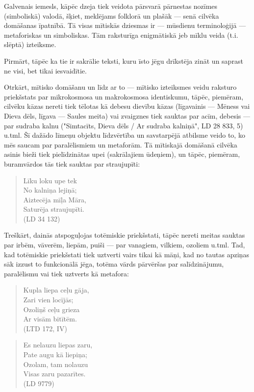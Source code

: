 \documentclass[11pt]{article}
\begin{document}
Galvenais iemesls, kāpēc dzeja tiek veidota pārsvarā
pārnestas nozīmes (simboliskā) valodā, šķiet, meklējams
folklorā un plašāk --- senā cilvēka domāšanas
īpatnībā. Tā visas mītiskās dziesmas ir --- mūsdienu
terminoloģijā --- metaforiskas un simboliskas.
Tām raksturīga enigmātiskā jeb mīklu veida
(t.i. slēptā) izteiksme.

Pirmārt, tāpēc ka tie ir sakrālie teksti, kuru īsto jēgu
drīkstēja zināt un saprast ne visi, bet tikai iesvaidītie.

Otrkārt, mītisko domāšanu un līdz ar to --- mītisko
izteiksmes veidu raksturo priekšstats par mikrokosmosa
un makrokosmosa identiskumu, tāpēc, piemēram,
cilvēku kāzas nereti tiek tēlotas kā debesu dievību kāzas
(līgavainis --- Mēness vai Dieva dēls, līgava --- Saules meita)
vai zvaigznes tiek sauktas par acīm, debesis --- par sudraba
kalnu ("Simtacīts, Dieva dēls / Ar sudraba kalniņā",
LD 28 833, 5) u.tml. Šī dažādo līmeņu objektu līdzvērtība
un savstarpējā atbilsme veido to, ko mēs saucam par
paralēlismiem un metaforām. Tā mītiskajā
domāšanā cilvēka asinis bieži tiek pielīdzinātas
upei (sakrālajiem ūdeņiem), un tāpēc, piemēram, buramvārdos
tās tiek sauktas par straujupīti:

\begin{quote}
Līku loku upe tek\\
No kalniņa lejiņā;\\
Aiztecēja mīļa Māra, \\
Saturēja straujupīti.\\
(LD 34 132)
\end{quote}

Treškārt, dainās atspoguļojas totēmiskie
priekšstati, tāpēc nereti meitas sauktas par
irbēm, vāverēm, liepām, puiši --- par vanagiem,
vilkiem, ozoliem u.tml. Tad, kad
totēmiskie priekšstati tiek uztverti vairs tikai
kā māņi, kad no tautas apziņas sāk izzust to
funkcionālā jēga, totēma vārds pārvēršas par salīdzinājumu,
paralēlismu vai tiek uztverts kā metafora:

\begin{quote}
Kupla liepa ceļu gāja,\\
Zari vien locījās;\\
Ozoliņš ceļu grieza\\
Ar visām bitītēm.\\
(LTD 172, IV)
\end{quote}

\begin{quote}
Es nelauzu liepas zaru,\\
Pate augu kā liepiņa;\\
Ozolam, tam nolauzu\\
Visas zaru pazarītes.\\
(LD 9779)
\end{quote}
\end{document}
